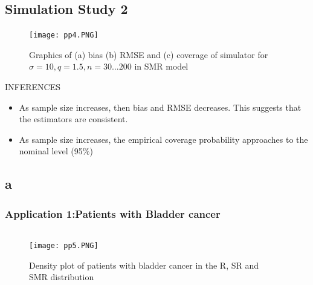 \documentclass{beamer}
\begin{document}
\subsection*{Simulation Study 2}
\begin{frame}[fragile]
\footnotesize

\begin{figure}[h]
\renewcommand{\theenumi}{1}
\centering
\texttt{[image: pp4.PNG]}
\caption{Graphics of (a) bias (b) RMSE and (c) coverage of simulator for $\sigma =10 , q = 1.5 , n = 30...200$ in SMR model }
\label{Fig:1}
\end{figure}
{INFERENCES}
\begin{itemize}
    \item As sample size increases, then bias and RMSE decreases. This suggests that the estimators are consistent.
    \item As sample size increases, the empirical coverage probability approaches to the nominal level (95\%)
\end{itemize}
\end{frame}

\subsection{a}
\begin{frame}
\frametitle{Application 1:Patients with Bladder cancer}
\footnotesize
\label{a}
\begin{columns}
\begin{column}{.6\textwidth}
\begin{figure}[h]
\renewcommand{\theenumi}{1}
\centering
\texttt{[image: pp5.PNG]}
\caption{Density plot of patients with bladder cancer in the R, SR and SMR distribution }
\label{Fig:1}
\end{figure}
\end{column}

\begin{column}{.4\textwidth}
\begin{table}[htbp]
\centering
\caption{\tiny Descriptive statistics}
\end{table}
\end{column}
\end{columns}
\end{frame}
\end{document}
